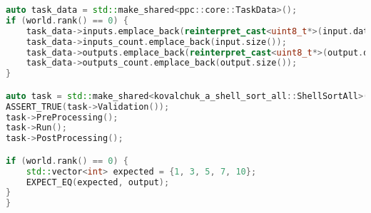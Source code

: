 \documentclass[12pt]{article}
\begin{document}
\begin{appendices}
\begin{lstlisting}[language=C++, caption=Фрагмент кода из func_all.cpp]
auto task_data = std::make_shared<ppc::core::TaskData>();
if (world.rank() == 0) {
    task_data->inputs.emplace_back(reinterpret_cast<uint8_t*>(input.data()));
    task_data->inputs_count.emplace_back(input.size());
    task_data->outputs.emplace_back(reinterpret_cast<uint8_t*>(output.data()));
    task_data->outputs_count.emplace_back(output.size());
}

auto task = std::make_shared<kovalchuk_a_shell_sort_all::ShellSortAll>(task_data);
ASSERT_TRUE(task->Validation());
task->PreProcessing();
task->Run();
task->PostProcessing();

if (world.rank() == 0) {
    std::vector<int> expected = {1, 3, 5, 7, 10};
    EXPECT_EQ(expected, output);
}
}
\end{lstlisting}
\end{appendices}
\end{document}
